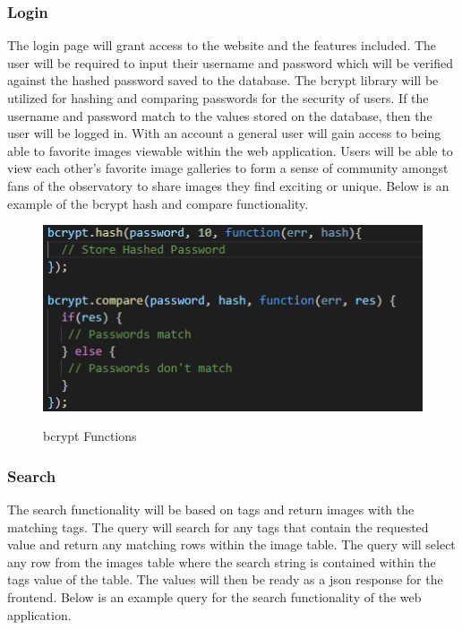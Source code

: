\documentclass[12pt]{report}
\begin{document}
\subsubsection*{Login}

The login page will grant access to the website and the features included.  The user will be required to input their username and password which will be verified against the hashed password saved to the database.  The bcrypt library will be utilized for hashing and comparing passwords for the security of users.  If the username and password match to the values stored on the database, then the user will be logged in.  With an account a general user will gain access to being able to favorite images viewable within the web application.  Users will be able to view each other’s favorite image galleries to form a sense of community amongst fans of the observatory to share images they find exciting or unique.  Below is an example of the bcrypt hash and compare functionality.

\begin{figure}[h]
	\centering
	\caption{bcrypt Functions}
	\includegraphics[scale=0.5]{api_bcrypt}
	\label{fig:API bcrypt}
\end{figure}

\subsubsection*{Search}

The search functionality will be based on tags and return images with the matching tags.  The query will search for any tags that contain the requested value and return any matching rows within the image table.  The query will select any row from the images table where the search string is contained within the tags value of the table.  The values will then be ready as a json response for the frontend.  Below is an example query for the search functionality of the web application.
\end{document}
